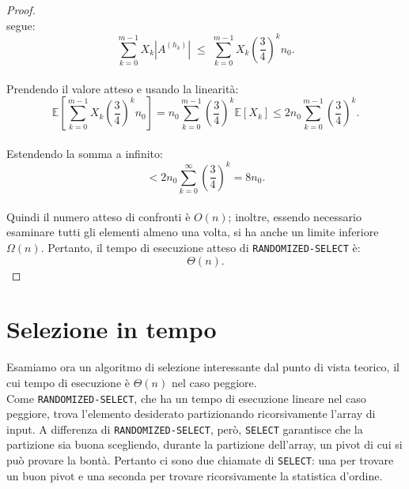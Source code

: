 \begin{proof}
\[\]
segue:
\[
\sum_{k=0}^{m-1} X_k |A^{(h_k)}|
\;\le\;
\sum_{k=0}^{m-1} X_k \left(\frac{3}{4}\right)^k n_0.
\]\\
Prendendo il valore atteso e usando la linearità:
\[
\mathbb{E}\!\left[\sum_{k=0}^{m-1} X_k \left(\frac{3}{4}\right)^k n_0 \right]
=
n_0 \sum_{k=0}^{m-1} \left(\frac{3}{4}\right)^k \mathbb{E}[X_k]
\le
2 n_0 \sum_{k=0}^{m-1} \left(\frac{3}{4}\right)^k.
\]\\
Estendendo la somma a infinito:
\[
< 2 n_0 \sum_{k=0}^{\infty} \left(\frac{3}{4}\right)^k
=
8 n_0.
\]\\
Quindi il numero atteso di confronti è $O(n)$; inoltre, essendo necessario esaminare tutti gli elementi almeno una volta, si ha anche un limite inferiore $\Omega(n)$. 
Pertanto, il tempo di esecuzione atteso di \texttt{RANDOMIZED-SELECT} è:
\[
\Theta(n).
\]
\end{proof}
\section{Selezione in tempo} 
Esamiamo ora un algoritmo di selezione interessante dal punto di vista teorico, il cui tempo di esecuzione è $\Theta(n)$ nel caso peggiore.\\
Come \texttt{RANDOMIZED-SELECT}, che ha un tempo di esecuzione lineare nel caso peggiore, trova l'elemento desiderato partizionando ricorsivamente l'array di input. A differenza di \texttt{RANDOMIZED-SELECT}, però, \texttt{SELECT} garantisce che la partizione sia buona scegliendo, durante la partizione dell'array, un pivot di cui si può provare la bontà. Pertanto ci sono due chiamate di \texttt{SELECT}: una per trovare un buon pivot e una seconda per trovare ricorsivamente la statistica d'ordine.\\
